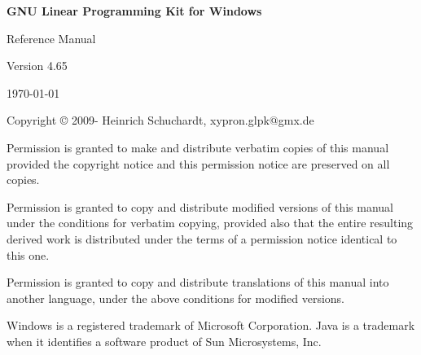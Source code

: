 \documentclass[a4paper,11pt]{report}
\newcommand{\glpkVersion}{4.65}
\begin{document}
\thispagestyle{empty}

\begin{center}

\vspace*{1in}

\begin{huge}
\sf\bfseries GNU Linear Programming Kit\linebreak
for Windows
\end{huge}

\vspace{0.5in}

\begin{LARGE}
\sf Reference Manual
\end{LARGE}

\vspace{0.5in}

\begin{LARGE}
\sf Version \glpkVersion
\end{LARGE}

\vspace{0.5in}
\begin{Large}
\sf \today
\end{Large}
\end{center}

\newpage

\vspace*{1in}

\vfill

\medskip \noindent
Copyright \copyright{} 2009-{\the\year} Heinrich Schuchardt, xypron.glpk@gmx.de

\medskip \noindent
Permission is granted to make and distribute verbatim copies of this
manual provided the copyright notice and this permission notice are
preserved on all copies.

\medskip \noindent
Permission is granted to copy and distribute modified versions of this
manual under the conditions for verbatim copying, provided also that the
entire resulting derived work is distributed under the terms of
a permission notice identical to this one.

\medskip \noindent
Permission is granted to copy and distribute translations of this manual
into another language, under the above conditions for modified versions.

\medskip \noindent
Windows is a registered trademark of Microsoft Corporation. Java is a 
trademark when it identifies a software product of Sun Microsystems, Inc.

\tableofcontents
\end{document}
